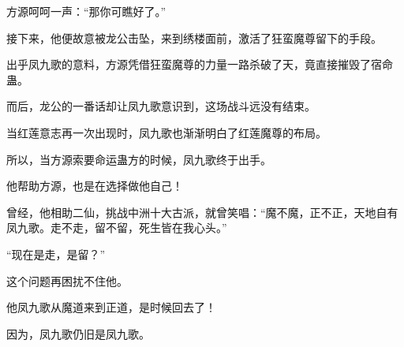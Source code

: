 \begin{this_body}
方源呵呵一声：“那你可瞧好了。”

接下来，他便故意被龙公击坠，来到绣楼面前，激活了狂蛮魔尊留下的手段。

出乎凤九歌的意料，方源凭借狂蛮魔尊的力量一路杀破了天，竟直接摧毁了宿命蛊。

而后，龙公的一番话却让凤九歌意识到，这场战斗远没有结束。

当红莲意志再一次出现时，凤九歌也渐渐明白了红莲魔尊的布局。

所以，当方源索要命运蛊方的时候，凤九歌终于出手。

他帮助方源，也是在选择做他自己！

曾经，他相助二仙，挑战中洲十大古派，就曾笑唱：“魔不魔，正不正，天地自有凤九歌。走不走，留不留，死生皆在我心头。”

“现在是走，是留？”

这个问题再困扰不住他。

他凤九歌从魔道来到正道，是时候回去了！

因为，凤九歌仍旧是凤九歌。

\end{this_body}

